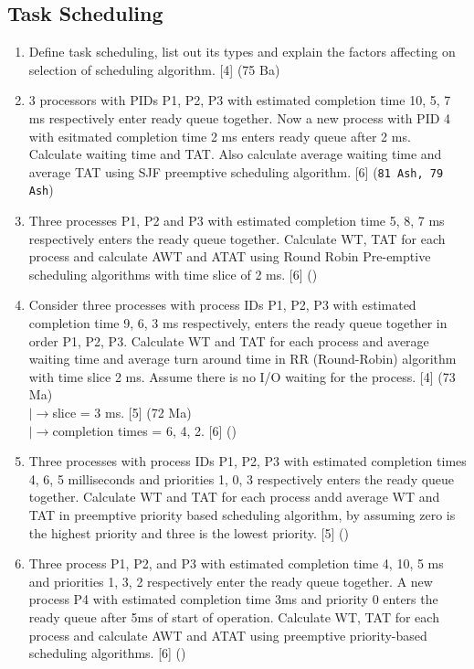 \documentclass[12pt]{article}
\newcommand{\lb}{\\$\left|\rightarrow\right.$}
\begin{document}
  \subsection{Task Scheduling}
    \begin{enumerate}
      \item Define task scheduling, list out its types and explain the factors affecting on selection of scheduling algorithm. \hfill [4] (75 Ba)

      \item 3 processors with PIDs P1, P2, P3 with estimated completion time 10, 5, 7 ms respectively enter ready queue together. Now a new process with PID 4 with esitmated completion time 2 ms enters ready queue after 2 ms. Calculate waiting time and TAT. Also calculate average waiting time and average TAT using SJF preemptive scheduling algorithm. \hfill [6] (\texttt{81 Ash, 79 Ash})

      \item Three processes P1, P2 and P3 with estimated completion time 5, 8, 7 ms respectively enters the ready queue together. Calculate WT, TAT for each process and calculate AWT and ATAT using Round Robin Pre-emptive scheduling algorithms with time slice of 2 ms. \hfill [6] ()

      \item Consider three processes with process IDs P1, P2, P3 with estimated completion time 9, 6, 3 ms respectively, enters the ready queue together in order P1, P2, P3. Calculate WT and TAT for each process and average waiting time and average turn around time in RR (Round-Robin) algorithm with time slice 2 ms. Assume there is no I/O waiting for the process. \hfill [4] (73 Ma)
      \lb slice = 3 ms. \hfill [5] (72 Ma)
      \lb completion times = 6, 4, 2. \hfill [6] ()

      \item Three processes with process IDs P1, P2, P3 with estimated completion times 4, 6, 5 milliseconds and priorities 1, 0, 3 respectively enters the ready queue together. Calculate WT and TAT for each process andd average WT and TAT in preemptive priority based scheduling algorithm, by assuming zero is the highest priority and three is the lowest priority. \hfill [5] ()

      \item Three process P1, P2, and P3 with estimated completion time 4, 10, 5 ms and priorities 1, 3, 2 respectively enter the ready queue together. A new process P4 with estimated completion time 3ms and priority 0 enters the ready queue after 5ms of start of operation. Calculate WT, TAT for each process and calculate AWT and ATAT using preemptive priority-based scheduling algorithms. \hfill [6] ()


\end{enumerate}
\end{document}
